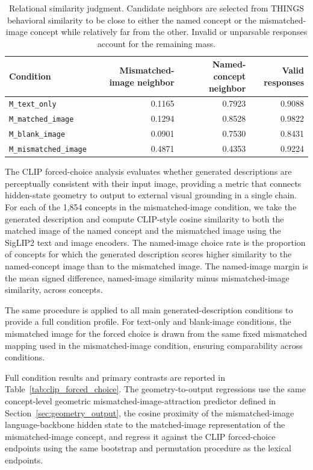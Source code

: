 \documentclass{article}
\begin{document}
\begin{table}[!htbp]
\centering
\caption{Relational similarity judgment. Candidate neighbors are selected from THINGS behavioral similarity to be close to either the named concept or the mismatched-image concept while relatively far from the other. Invalid or unparsable responses account for the remaining mass.}
\label{tab:similarity_judgment_appendix}
\small
\begin{tabular}{lrrr}
\toprule
Condition & Mismatched-image neighbor & Named-concept neighbor & Valid responses \\
\midrule
\texttt{M\_text\_only} & 0.1165 & 0.7923 & 0.9088 \\
\texttt{M\_matched\_image} & 0.1294 & 0.8528 & 0.9822 \\
\texttt{M\_blank\_image} & 0.0901 & 0.7530 & 0.8431 \\
\texttt{M\_mismatched\_image} & 0.4871 & 0.4353 & 0.9224 \\
\bottomrule
\end{tabular}
\end{table}

The CLIP forced-choice analysis evaluates whether generated descriptions are perceptually consistent with their input image, providing a metric that connects hidden-state geometry to output to external visual grounding in a single chain. For each of the 1,854 concepts in the mismatched-image condition, we take the generated description and compute CLIP-style cosine similarity to both the matched image of the named concept and the mismatched image using the SigLIP2 text and image encoders. The named-image choice rate is the proportion of concepts for which the generated description scores higher similarity to the named-concept image than to the mismatched image. The named-image margin is the mean signed difference, named-image similarity minus mismatched-image similarity, across concepts.

The same procedure is applied to all main generated-description conditions to provide a full condition profile. For text-only and blank-image conditions, the mismatched image for the forced choice is drawn from the same fixed mismatched mapping used in the mismatched-image condition, ensuring comparability across conditions.

Full condition results and primary contrasts are reported in Table~\ref{tab:clip_forced_choice}. The geometry-to-output regressions use the same concept-level geometric mismatched-image-attraction predictor defined in Section~\ref{sec:geometry_output}, the cosine proximity of the mismatched-image language-backbone hidden state to the matched-image representation of the mismatched-image concept, and regress it against the CLIP forced-choice endpoints using the same bootstrap and permutation procedure as the lexical endpoints.
\end{document}
